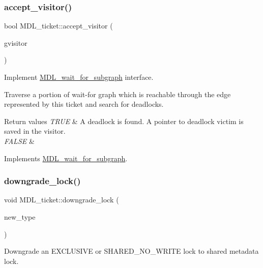 \subsubsection{\texorpdfstring{accept\+\_\+visitor()}{accept\_visitor()}}
{\footnotesize\ttfamily bool M\+D\+L\+\_\+ticket\+::accept\+\_\+visitor (\begin{DoxyParamCaption}\item[{\mbox{\hyperlink{classMDL__wait__for__graph__visitor}{M\+D\+L\+\_\+wait\+\_\+for\+\_\+graph\+\_\+visitor}} $\ast$}]{gvisitor }\end{DoxyParamCaption})\hspace{0.3cm}{\ttfamily [virtual]}}

Implement \mbox{\hyperlink{classMDL__wait__for__subgraph}{M\+D\+L\+\_\+wait\+\_\+for\+\_\+subgraph}} interface.

Traverse a portion of wait-\/for graph which is reachable through the edge represented by this ticket and search for deadlocks.


\begin{DoxyRetVals}{Return values}
{\em T\+R\+UE} & A deadlock is found. A pointer to deadlock victim is saved in the visitor. \\
\hline
{\em F\+A\+L\+SE} & \\
\hline
\end{DoxyRetVals}


Implements \mbox{\hyperlink{classMDL__wait__for__subgraph_ad14f796a25430ecabd24572efa22f3f5}{M\+D\+L\+\_\+wait\+\_\+for\+\_\+subgraph}}.

\mbox{\label{classMDL__ticket_a4fd3f255fe828cbf0d95a5d02d70d302}} 
\subsubsection{\texorpdfstring{downgrade\+\_\+lock()}{downgrade\_lock()}}
{\footnotesize\ttfamily void M\+D\+L\+\_\+ticket\+::downgrade\+\_\+lock (\begin{DoxyParamCaption}\item[{enum\+\_\+mdl\+\_\+type}]{new\+\_\+type }\end{DoxyParamCaption})}

Downgrade an E\+X\+C\+L\+U\+S\+I\+VE or S\+H\+A\+R\+E\+D\+\_\+\+N\+O\+\_\+\+W\+R\+I\+TE lock to shared metadata lock.


